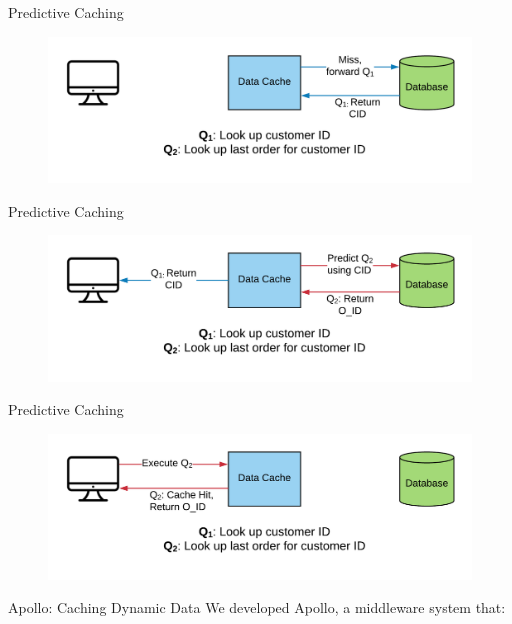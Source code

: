 \documentclass[10pt]{beamer}
\begin{document}
\begin{frame}{Predictive Caching}
    \begin{figure}
        \center
        \includegraphics[scale=0.17]{apollo_predictive_execution_2}
    \end{figure}
\end{frame}

\begin{frame}{Predictive Caching}
    \begin{figure}
        \center
        \includegraphics[scale=0.17]{apollo_predictive_execution_4}
    \end{figure}
\end{frame}

\begin{frame}{Predictive Caching}
    \begin{figure}
        \center
        \includegraphics[scale=0.17]{apollo_predictive_execution_5}
    \end{figure}
\end{frame}

\begin{frame}{Apollo: Caching Dynamic Data}
    We developed Apollo, a middleware system that:
    \begin{itemize}
    \end{itemize}
\end{frame}
\end{document}
